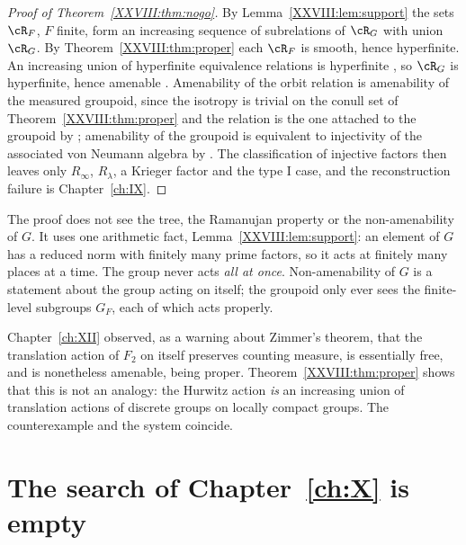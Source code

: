 \begin{proof}[Proof of Theorem~\ref{XXVIII:thm:nogo}]
By Lemma~\ref{XXVIII:lem:support} the sets $\cR_F$, $F$ finite, form an increasing sequence of
subrelations of $\cR_G$ with union $\cR_G$. By Theorem~\ref{XXVIII:thm:proper} each $\cR_F$ is smooth,
hence hyperfinite. An increasing union of hyperfinite equivalence relations is hyperfinite
\cite{Dye,CFW}, so $\cR_G$ is hyperfinite, hence amenable \cite{Zimmer}. Amenability of the orbit
relation is amenability of the measured groupoid, since the isotropy is trivial on the conull set
of Theorem~\ref{XXVIII:thm:proper} and the relation is the one attached to the groupoid by \cite{FM};
amenability of the groupoid is equivalent to injectivity of the associated von Neumann algebra by
\cite{CFW,ADR}. The classification of injective factors then leaves only
$R_\infty$, $R_\lambda$, a Krieger factor and the type I case, and the reconstruction failure is
Chapter~\ref{ch:IX}.
\end{proof}

\begin{remark}\label{XXVIII:rem:whyno}
The proof does not see the tree, the Ramanujan property or the non-amenability of $G$. It uses one
arithmetic fact, Lemma~\ref{XXVIII:lem:support}: an element of $G$ has a reduced norm with finitely many
prime factors, so it acts at finitely many places at a time. The group never acts \emph{all at
once}. Non-amenability of $G$ is a statement about the group acting on itself; the groupoid only
ever sees the finite-level subgroups $G_F$, each of which acts properly.
\end{remark}

\begin{remark}\label{XXVIII:rem:F2}
Chapter~\ref{ch:XII} observed, as a warning about Zimmer's theorem, that the translation action of $F_2$ on
itself preserves counting measure, is essentially free, and is nonetheless amenable, being proper.
Theorem~\ref{XXVIII:thm:proper} shows that this is not an analogy: the Hurwitz action \emph{is} an
increasing union of translation actions of discrete groups on locally compact groups. The
counterexample and the system coincide.
\end{remark}

\section[The search of Chapter X is empty]{The search of Chapter~\ref{ch:X} is empty}\label{XXVIII:sec:general}

